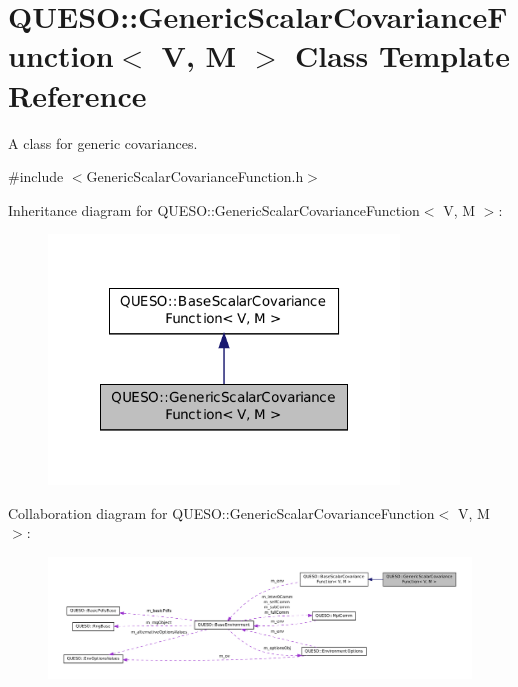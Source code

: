 \hypertarget{class_q_u_e_s_o_1_1_generic_scalar_covariance_function}{\section{Q\-U\-E\-S\-O\-:\-:Generic\-Scalar\-Covariance\-Function$<$ V, M $>$ Class Template Reference}
\label{class_q_u_e_s_o_1_1_generic_scalar_covariance_function}
}


A class for generic covariances.  




{\ttfamily \#include $<$Generic\-Scalar\-Covariance\-Function.\-h$>$}



Inheritance diagram for Q\-U\-E\-S\-O\-:\-:Generic\-Scalar\-Covariance\-Function$<$ V, M $>$\-:
\nopagebreak
\begin{figure}[H]
\begin{center}
\leavevmode
\includegraphics[width=264pt]{class_q_u_e_s_o_1_1_generic_scalar_covariance_function__inherit__graph}
\end{center}
\end{figure}


Collaboration diagram for Q\-U\-E\-S\-O\-:\-:Generic\-Scalar\-Covariance\-Function$<$ V, M $>$\-:
\nopagebreak
\begin{figure}[H]
\begin{center}
\leavevmode
\includegraphics[width=350pt]{class_q_u_e_s_o_1_1_generic_scalar_covariance_function__coll__graph}
\end{center}
\end{figure}
